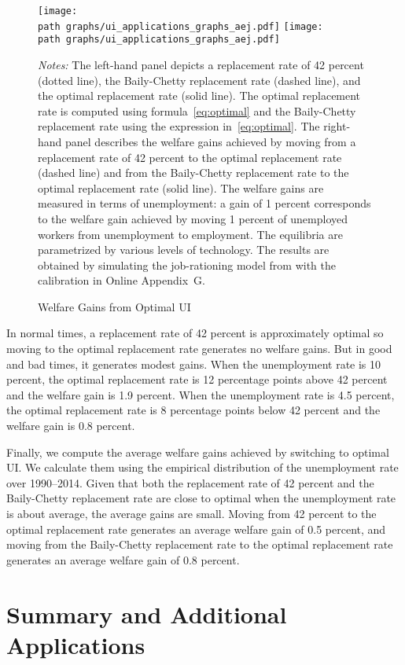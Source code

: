 \documentclass[letterpaper,12pt,leqno]{article}
\def\path{../}
\newcommand{\fignotes}[1]{\centering\parbox[c]{\textwidth}{\footnotesize \textit{Notes:} #1}}
\begin{document}
\begin{figure}[t!] \centering
\texttt{[image: \\path graphs/ui\_applications\_graphs\_aej.pdf]}\quad
\texttt{[image: \\path graphs/ui\_applications\_graphs\_aej.pdf]}
\caption{Welfare Gains from Optimal UI}
\fignotes{The left-hand panel depicts a replacement rate of 42 percent (dotted line), the Baily-Chetty replacement rate (dashed line), and the optimal replacement rate (solid line). The optimal replacement rate is computed using formula~\eqref{eq:optimal} and the Baily-Chetty replacement rate using the expression in~\eqref{eq:optimal}. The right-hand panel describes the welfare gains achieved by moving from a replacement rate of 42 percent to the optimal replacement rate (dashed line) and from the Baily-Chetty replacement rate to the optimal replacement rate (solid line). The welfare gains are measured in terms of unemployment: a gain of 1 percent corresponds to the welfare gain achieved by moving 1 percent of unemployed workers from unemployment to employment. The equilibria are parametrized by various levels of technology. The results are obtained by simulating the job-rationing model from \citet{M09} with the calibration in Online Appendix~G.}
\label{fig:gains}\end{figure}

In normal times, a replacement rate of 42 percent is approximately optimal so moving to the optimal replacement rate generates no welfare gains. But in good and bad times, it generates modest gains. When the unemployment rate is 10 percent, the optimal replacement rate is 12 percentage points above 42 percent  and the welfare gain is 1.9 percent. When the unemployment rate is 4.5 percent, the optimal replacement rate is 8 percentage points below 42 percent and the welfare gain is 0.8 percent. 

Finally, we compute the average welfare gains achieved by switching to optimal UI. We calculate them using the empirical distribution of the unemployment rate over 1990--2014. Given that both the replacement rate of 42 percent and the Baily-Chetty replacement rate are close to optimal when the unemployment rate is about average, the average gains are small. Moving from 42 percent to the optimal replacement rate generates an average welfare gain of 0.5 percent, and moving from the Baily-Chetty replacement rate to the optimal replacement rate generates an average welfare gain of 0.8 percent.

\section{Summary and Additional Applications}\label{sec:ccl}
\end{document}
